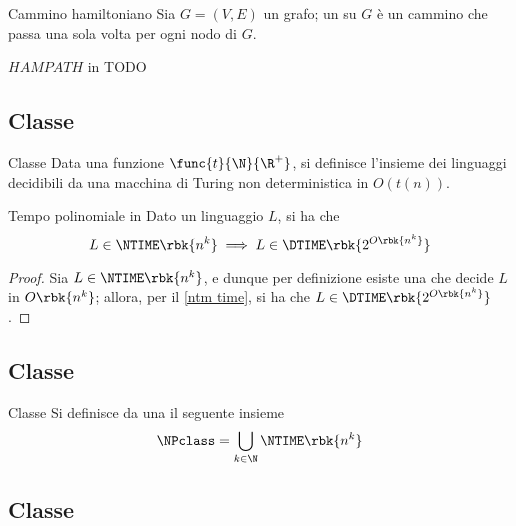 \documentclass[a4paper, 12pt]{report}
\begin{document}
    \begin{frameddefn}{Cammino hamiltoniano}
        Sia $G = (V, E)$ un grafo; un  su $G$ è un cammino che passa una sola volta per ogni nodo di $G$.
    \end{frameddefn}

    \begin{framedthm}{$HAMPATH$ in \EXP}
        TODO
    \end{framedthm}

    \subsection{Classe \NTIME}

    \begin{frameddefn}{Classe \NTIME}
        Data una funzione $\func{t}{\N}{\R^+}$, si definisce  l'insieme dei linguaggi decidibili da una macchina di Turing non deterministica in $O(t(n))$.
    \end{frameddefn}

    \begin{framedprop}{Tempo polinomiale in \NTIME}
        Dato un linguaggio $L$, si ha che $$L \in \NTIME\rbk{n^k} \implies L \in \DTIME \rbk{2^{O\rbk{n^k}}}$$
    \end{framedprop}

    \begin{proof}
        Sia $L \in \NTIME\rbk{n^k}$, e dunque per definizione esiste una \NTM che decide $L$ in $O\rbk{n^k}$; allora, per il \cref{ntm time}, si ha che $L \in \DTIME \rbk{2^{O\rbk{n^k}}}$.
    \end{proof}

    \subsection{Classe \NPclass}
    
    \begin{frameddefn}{Classe \NPclass}
        Si definisce  da una \NTM il seguente insieme $$\NPclass = \bigcup_{k \in \N}{\NTIME \rbk{n^k}}$$
    \end{frameddefn}

    \subsection{Classe \NEXP}
\end{document}
